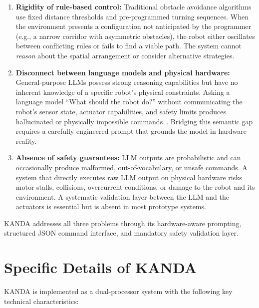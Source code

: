 \begin{enumerate}[label=\arabic*.]
  \item \textbf{Rigidity of rule-based control:} Traditional obstacle avoidance algorithms use fixed distance thresholds and pre-programmed turning sequences. When the environment presents a configuration not anticipated by the programmer (e.g., a narrow corridor with asymmetric obstacles), the robot either oscillates between conflicting rules or fails to find a viable path. The system cannot \textit{reason} about the spatial arrangement or consider alternative strategies.

  \item \textbf{Disconnect between language models and physical hardware:} General-purpose LLMs possess strong reasoning capabilities but have no inherent knowledge of a specific robot's physical constraints. Asking a language model ``What should the robot do?'' without communicating the robot's sensor state, actuator capabilities, and safety limits produces hallucinated or physically impossible commands~\cite{ahn2022saycan}. Bridging this semantic gap requires a carefully engineered prompt that grounds the model in hardware reality.

  \item \textbf{Absence of safety guarantees:} LLM outputs are probabilistic and can occasionally produce malformed, out-of-vocabulary, or unsafe commands. A system that directly executes raw LLM output on physical hardware risks motor stalls, collisions, overcurrent conditions, or damage to the robot and its environment. A systematic validation layer between the LLM and the actuators is essential but is absent in most prototype systems.
\end{enumerate}

KANDA addresses all three problems through its hardware-aware prompting, structured JSON command interface, and mandatory safety validation layer.

\section{Specific Details of KANDA}
\label{sec:specific}

KANDA is implemented as a dual-processor system with the following key technical characteristics:

